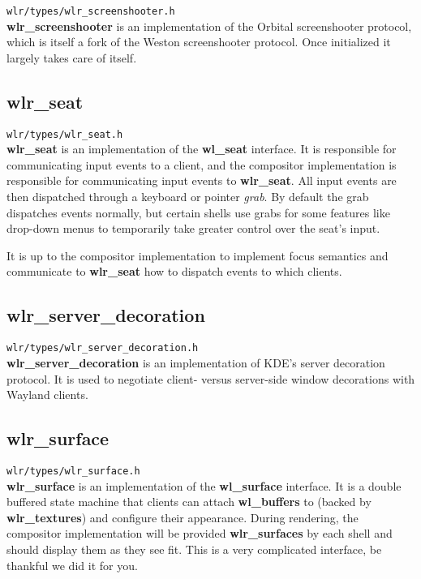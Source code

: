 \documentclass{article}
\newcommand{\code}[1]{\texttt{#1}}
\begin{document}
\code{wlr/types/wlr_screenshooter.h}\\

\textbf{wlr_screenshooter} is an implementation of the Orbital screenshooter
protocol, which is itself a fork of the Weston screenshooter protocol. Once
initialized it largely takes care of itself.

\subsection{wlr_seat}\label{wlr seat}

\code{wlr/types/wlr_seat.h}\\

\textbf{wlr_seat} is an implementation of the \textbf{wl_seat} interface. It is
responsible for communicating input events to a client, and the compositor
implementation is responsible for communicating input events to
\textbf{wlr_seat}. All input events are then dispatched through a keyboard or
pointer \emph{grab}. By default the grab dispatches events normally, but certain
shells use grabs for some features like drop-down menus to temporarily take
greater control over the seat's input.

It is up to the compositor implementation to implement focus semantics and
communicate to \textbf{wlr_seat} how to dispatch events to which clients.

\subsection{wlr_server_decoration}\label{wlr server decoration}

\code{wlr/types/wlr_server_decoration.h}\\

\textbf{wlr_server_decoration} is an implementation of KDE's server decoration
protocol. It is used to negotiate client- versus server-side window decorations
with Wayland clients.

\subsection{wlr_surface}\label{wlr surface}

\code{wlr/types/wlr_surface.h}\\

\textbf{wlr_surface} is an implementation of the \textbf{wl_surface} interface.
It is a double buffered state machine that clients can attach
\textbf{wl_buffers} to (backed by \textbf{wlr_textures}) and configure their
appearance. During rendering, the compositor implementation will be provided
\textbf{wlr_surfaces} by each shell and should display them as they see fit.
This is a very complicated interface, be thankful we did it for you.
\end{document}
